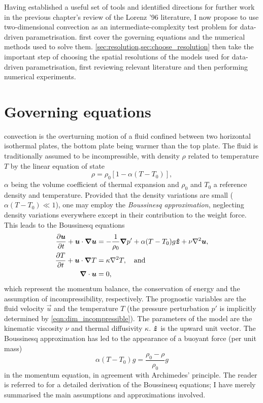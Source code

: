 \documentclass[../main.tex]{subfiles}
\begin{document}
Having established a useful set of tools and identified directions for further
work in the previous chapter's review of the Lorenz '96 literature, I now
propose to use two-dimensional \rb{} convection as an intermediate-complexity
test problem for data-driven parametrisation.
 first cover the governing equations
and the numerical methods used to solve them.
\cref{sec:resolution,sec:choose_resolution} then take the important step of
choosing the spatial resolutions of the models used for data-driven
parametrisation, first reviewing relevant literature and then performing
numerical experiments.


\section{Governing equations}
\label{sec:rb_equations}
\rb{} convection is the overturning motion of a fluid confined between two
horizontal isothermal plates, the bottom plate being warmer than the top plate.
The fluid is traditionally assumed to be incompressible, with density $\rho$
related to temperature $T$ by the linear equation of state
\[
    \rho = \rho_0 [1 - \alpha(T - T_0)],
\]
$\alpha$ being the volume coefficient of thermal expansion and $\rho_0$ and
$T_0$ a reference density and temperature. Provided that the density variations
are small ($\alpha (T - T_0) \ll 1$), one may employ the \emph{Boussinesq
approximation}, neglecting density variations everywhere except in their
contribution to the weight force. This leads to the Boussinesq equations
\begin{align}
    \label{eqn:dim_momentum}
    \frac{\partial \bm{u}}{\partial t} + \bm{u} \cdot \bm{\nabla} \bm{u}
        &= -\frac{1}{\rho_0} \bm{\nabla} p' + \alpha (T - T_0) g \bm{\hat{z}}
            + \nu \nabla^2 \bm{u}, \\
    \label{eqn:dim_energy}
    \frac{\partial T}{\partial t} + \bm{u} \cdot \bm{\nabla} T &= \kappa \nabla^2 T,
        \quad \text{and} \\
    \label{eqn:dim_incompressible}
    \bm{\nabla} \cdot \bm{u} &= 0,
\end{align}
which represent the momentum balance, the conservation of energy and the
assumption of incompressibility, respectively. The prognostic variables are the
fluid velocity $\vec{u}$ and the temperature $T$ (the pressure perturbation
$p'$ is implicitly determined by \cref{eqn:dim_incompressible}). The parameters
of the model are the kinematic viscosity $\nu$ and thermal diffusivity
$\kappa$. $\bm{\hat{z}}$ is the upward unit vector. The Boussinesq approximation
has led to the appearance of a buoyant force (per unit mass)
\[
    \alpha (T - T_0) g = \frac{\rho_0 - \rho}{\rho_0} g
\]
in the momentum equation, in agreement with Archimedes' principle. The reader
is referred to \textcite{chandrasekhar1961} for a detailed derivation of the
Boussinesq equations; I have merely summarised the main assumptions and
approximations involved.
\end{document}
